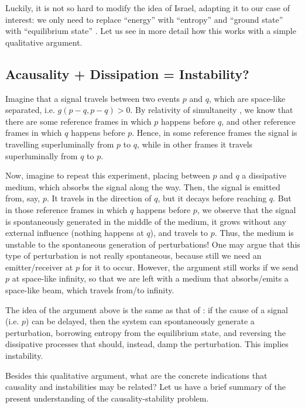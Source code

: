 \documentclass[a4paper, amsfonts, amssymb, amsmath, reprint, showkeys,  twoside, onecolumn,notitlepage,nofootinbib]{revtex4-1}
\theoremstyle{definition}
\theoremstyle{theorem}
\begin{document}
Luckily, it is not so hard to modify the idea of Israel, adapting it to our case of interest: we only need to replace ``energy'' with ``entropy'' and ``ground state'' with ``equilibrium state'' \cite{GavassinoCausality2021}. Let us see in more detail how this works with a simple qualitative argument.






\subsection{Acausality + Dissipation = Instability?}\label{ilprimoluiluilui}

Imagine that a signal travels between two events $p$ and $q$, which are space-like separated, i.e. $g(p-q,p-q)>0$. By relativity of simultaneity \cite{special_in_gen}, we know that there are some reference frames in which $p$ happens before $q$, and other reference frames in which $q$ happens before $p$. Hence, in some reference frames the signal is travelling superluminally from $p$  to $q$, while in other frames it travels superluminally from $q$ to $p$.

Now, imagine to repeat this experiment, placing between $p$ and $q$ a dissipative medium, which absorbs the signal along the way. Then, the signal is emitted from, say, $p$. It travels in the direction of $q$, but it decays before reaching $q$. But in those reference frames in which $q$ happens before $p$, we observe that the signal is spontaneously generated in the middle of the medium, it grows without any external influence (nothing happens at $q$), and travels to $p$. Thus, the medium is unstable to the spontaneous generation of perturbations! One may argue that this type of perturbation is not really spontaneous, because still we need an emitter/receiver at $p$ for it to occur. However, the argument still works if we send $p$ at space-like infinity, so that we are left with a medium that absorbs/emits a space-like beam, which travels from/to infinity.  

The idea of the argument above is the same as that of \citet{Israel_2009_inbook}: if the cause of a signal (i.e. $p$) can be delayed, then the system can spontaneously generate a perturbation, borrowing entropy from the equilibrium state, and reversing the dissipative processes that should, instead, damp the perturbation. This implies instability.

Besides this qualitative argument, what are the concrete indications that causality and instabilities may be related? Let us have a brief summary of the present understanding of the causality-stability problem.
\end{document}
